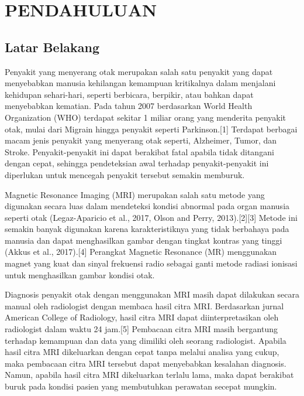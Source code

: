 \section{PENDAHULUAN}

\subsection{Latar Belakang}

Penyakit yang menyerang otak merupakan salah satu penyakit yang dapat menyebabkan manusia kehilangan kemampuan kritikalnya dalam menjalani kehidupan sehari-hari, seperti berbicara, berpikir, atau bahkan dapat menyebabkan kematian. Pada tahun 2007 berdasarkan World Health Organization (WHO) terdapat sekitar 1 miliar orang yang menderita penyakit otak, mulai dari Migrain hingga penyakit seperti Parkinson.[1] Terdapat berbagai macam jenis penyakit yang menyerang otak seperti, Alzheimer, Tumor, dan Stroke. Penyakit-penyakit ini dapat berakibat fatal apabila tidak ditangani dengan cepat, sehingga pendeteksian awal  terhadap penyakit-penyakit ini diperlukan untuk mencegah penyakit tersebut semakin memburuk.

Magnetic Resonance Imaging (MRI) merupakan salah satu metode yang digunakan secara luas dalam mendeteksi kondisi abnormal pada organ manusia seperti otak (Legaz-Aparicio et al., 2017, Olson and Perry, 2013).[2][3] Metode ini semakin banyak digunakan karena karakteristiknya yang tidak berbahaya pada manusia dan dapat menghasilkan gambar dengan tingkat kontras yang tinggi (Akkus et al., 2017).[4] Perangkat Magnetic Resonance (MR) menggunakan magnet yang kuat dan sinyal frekuensi radio sebagai ganti metode radiasi ionisasi untuk menghasilkan gambar kondisi otak.

Diagnosis penyakit otak dengan menggunakan MRI masih dapat dilakukan secara manual oleh radiologist dengan membaca hasil citra MRI. Berdasarkan jurnal American College of Radiology, hasil citra MRI dapat diinterpretasikan oleh radiologist dalam waktu 24 jam.[5] Pembacaan citra MRI masih bergantung terhadap kemampuan dan data yang dimiliki oleh seorang radiologist. Apabila hasil citra MRI dikeluarkan dengan cepat tanpa melalui analisa yang cukup, maka pembacaan citra MRI tersebut dapat menyebabkan kesalahan diagnosis. Namun, apabila hasil citra MRI dikeluarkan terlalu lama, maka dapat berakibat buruk pada kondisi pasien yang membutuhkan perawatan secepat mungkin.

